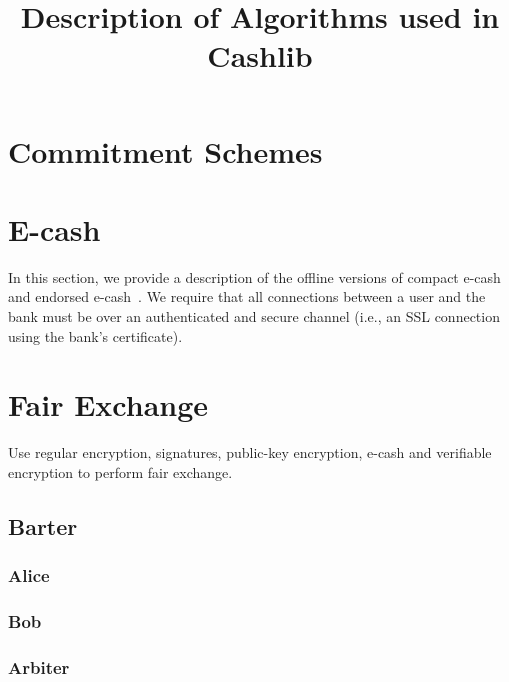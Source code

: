 \documentclass[letterpaper,11pt]{article}
\title{Description of Algorithms used in Cashlib}
\begin{document}
\maketitle




\newpage
\tableofcontents
\newpage





\section{Commitment Schemes}












\section{E-cash}
In this section, we provide a description of the offline versions of
compact e-cash~\cite{chl:compact-ecash:ec05} and endorsed 
e-cash~\cite{clm:endorsed-ecash:ieee07}.  We require that all connections 
between a user and the bank must be over an authenticated and secure channel 
(i.e., an SSL connection using the bank's certificate).






\section{Fair Exchange}
Use regular encryption, signatures, public-key encryption, e-cash and verifiable encryption to perform fair exchange.

\subsection{Barter}
\subsubsection{Alice}
\subsubsection{Bob}
\subsubsection{Arbiter}

\appendix




\end{document}
